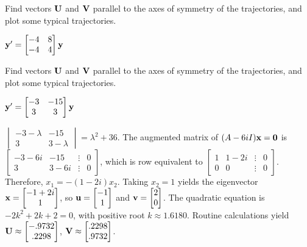 \documentclass{ximera}
\begin{document}
 \begin{problem}\label{exer:10.6.31}   
 Find vectors
${\bf U}$ and ${\bf V}$ parallel to the axes of symmetry of the
trajectories, and plot some typical trajectories.

$ {\bf y}'= \begin{bmatrix}-4&8\\-4&4\end{bmatrix}{\bf y}$
 \end{problem}

 \begin{problem}\label{exer:10.6.32}  
 Find vectors
${\bf U}$ and ${\bf V}$ parallel to the axes of symmetry of the
trajectories, and plot some typical trajectories.

$ {\bf y}'= \begin{bmatrix}-3&-15\\3&3\end{bmatrix}{\bf y}$

\begin{solution}
    $\begin{vmatrix}-3-\lambda&-15\\3&3-\lambda
\end{vmatrix}=\lambda^2+36$.
The augmented matrix of $(A-6iI){\bf x}={\bf 0}$ is
$ \begin{bmatrix}-3-6i&-15&\vdots&0\\
3&3-6i&\vdots&0  \end{bmatrix}$,
which is row equivalent to
$ \begin{bmatrix} 1&1-2i&\vdots&0\\ 0&0&\vdots&0
 \end{bmatrix}$.
Therefore, $x_1=-(1-2i)x_2$. Taking $x_2=1$
yields the eigenvector
 ${\bf x}= \begin{bmatrix}-1+2i\\1 \end{bmatrix}$,
so ${\bf u}=  \begin{bmatrix}-1\\1\end{bmatrix}$ and ${\bf v}=  \begin{bmatrix}2\\0\end{bmatrix}$.
The quadratic equation is $-2k^2+2k+2=0$, with positive root
$k\approx1.6180$.
 Routine calculations yield
 ${\bf U}\approx  \begin{bmatrix}-.9732\\.2298\end{bmatrix}$,
${\bf V}\approx  \begin{bmatrix}.2298\\.9732\end{bmatrix}$.
\end{solution}
 \end{problem}
 
\end{document}
